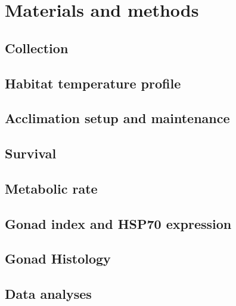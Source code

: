 \documentclass[
  oneside, 11pt, a4paper]{memoir}
\begin{document}
\hypertarget{materials-and-methods}{%
\section{Materials and methods}\label{materials-and-methods}}

\hypertarget{collection}{%
\subsection{Collection}\label{collection}}

\hypertarget{habitat-temperature-profile}{%
\subsection{Habitat temperature profile}\label{habitat-temperature-profile}}

\hypertarget{acclimation-setup-and-maintenance}{%
\subsection{Acclimation setup and maintenance}\label{acclimation-setup-and-maintenance}}

\hypertarget{survival}{%
\subsection{Survival}\label{survival}}

\hypertarget{metabolic-rate}{%
\subsection{Metabolic rate}\label{metabolic-rate}}

\hypertarget{gonad-index-and-hsp70-expression}{%
\subsection{Gonad index and HSP70 expression}\label{gonad-index-and-hsp70-expression}}

\hypertarget{gonad-histology}{%
\subsection{Gonad Histology}\label{gonad-histology}}

\hypertarget{data-analyses}{%
\subsection{Data analyses}\label{data-analyses}}
\end{document}
